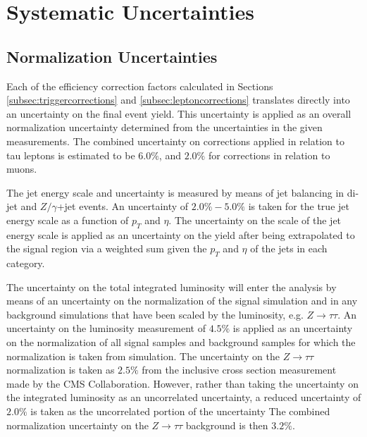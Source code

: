 \section{Systematic Uncertainties}
\label{sec:systematics}
\subsection{Normalization Uncertainties}
Each of the efficiency correction factors calculated in Sections \ref{subsec:triggercorrections} and \ref{subsec:leptoncorrections} translates directly into an uncertainty on the final event yield.
This uncertainty is applied as an overall normalization uncertainty determined from the uncertainties in the given measurements.
The combined uncertainty on corrections applied in relation to tau leptons is estimated to be $6.0\%$, and $2.0\%$ for corrections in relation to muons.

The jet energy scale and uncertainty is measured by means of jet balancing in di-jet and $Z/\gamma$+jet events\cite{JETENERGYSCALE}.
An uncertainty of $2.0\% - 5.0\%$ is taken for the true jet energy scale as a function of $p_{T}$ and $\eta$.
The uncertainty on the scale of the jet energy scale is applied as an uncertainty on the yield after being extrapolated to the signal region via a weighted sum given the $p_{T}$ and $\eta$ of the jets in each category.

The uncertainty on the total integrated luminosity will enter the analysis by means of an uncertainty on the normalization of the signal simulation and in any background simulations that have been scaled by the luminosity, e.g. $Z\rightarrow\tau\tau$.
An uncertainty on the luminosity measurement of $4.5\%$ is applied as an uncertainty on the normalization of all signal samples and background samples for which the normalization is taken from simulation\cite{LUMI}. The uncertainty on the $Z \rightarrow \tau\tau$ normalization is taken as $2.5\%$ from the inclusive cross section measurement made by the CMS Collaboration\cite{Z_TAUTAU_CROSS_SECTION}. 
However, rather than taking the uncertainty on the integrated luminosity as an uncorrelated uncertainty, a reduced uncertainty of $2.0\%$ is taken as the uncorrelated portion of the uncertainty
The combined normalization uncertainty on the $Z\rightarrow\tau\tau$ background is then $3.2\%$. 

